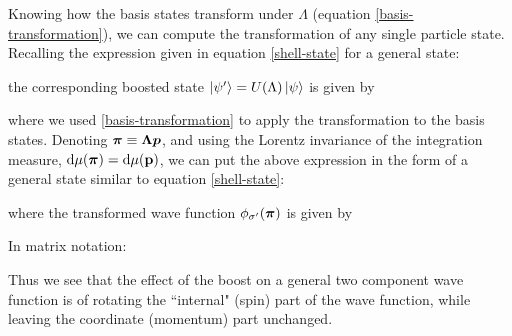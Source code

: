\documentclass[12pt,a4paper,notitlepage]{report}
\begin{document}
Knowing how the basis states transform under $\Lambda$ (equation \eqref{basis-transformation}), we can compute the transformation of any single particle state. Recalling the expression given in equation \eqref{shell-state} for a general state:

%
the corresponding boosted state $\ket{\psi'} = U(\Lambda)\ket{\psi}$ is given by

%
where we used \eqref{basis-transformation} to apply the transformation to the basis states. Denoting $\vb*{\pi} \equiv \vb*{\Lambda p}$, and using the Lorentz invariance of the integration measure, $\dd{\mu(\vb*{\pi})} = \dd{\mu(\vb{p})}$, we can put the above expression in the form of a general state similar to equation \eqref{shell-state}:

%
where the transformed wave function $\phi_{\sigma'}(\vb*{\pi})$ is given by

%
In matrix notation:

%
Thus we see that the effect of the boost on a general two component wave function is of rotating the ``internal" (spin) part of the wave function, while leaving the coordinate (momentum) part unchanged.
\end{document}
